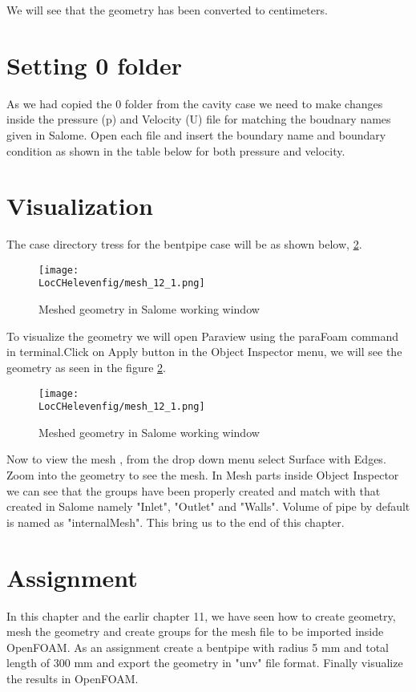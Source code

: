 
We will see that the geometry has been converted to centimeters.

\section{Setting 0 folder}

As we had copied the 0 folder from the cavity case we need to make changes inside the pressure (p) and Velocity (U) file for matching the boudnary names given in Salome. Open each file and insert the boundary name and boundary condition as shown in the table below for both pressure and velocity.


\section{Visualization}

The case directory tress for the bentpipe case will be as shown below, \ref{mesh_1}.

\begin{figure}[h]  
\centering
\texttt{[image: \\LocCHelevenfig/mesh\_12\_1.png]}
\caption{Meshed geometry in Salome working window}
\label{mesh_1}
\end{figure}

To visualize the geometry we will open Paraview using the paraFoam command in terminal.Click on Apply button in the Object Inspector menu, we will see the geometry as seen in the figure \ref{mesh_1}.

\begin{figure}[h]  
\centering
\texttt{[image: \\LocCHelevenfig/mesh\_12\_1.png]}
\caption{Meshed geometry in Salome working window}
\label{mesh_1}
\end{figure}

Now to view the mesh , from the drop down menu select Surface with Edges. Zoom into the geometry to see the mesh. In Mesh parts inside Object Inspector we can see that the groups have been properly created and match with that created in Salome namely "Inlet", "Outlet" and "Walls". Volume of pipe by default is named as "internalMesh". This bring us to the end of this chapter.

\section{Assignment}

In this chapter and the earlir chapter 11, we have seen how to create geometry, mesh the geometry and create groups for the mesh file to be imported inside OpenFOAM. As an assignment create a bentpipe with radius 5 mm and total length of 300 mm and export the geometry in "unv" file format. Finally visualize the results in OpenFOAM.